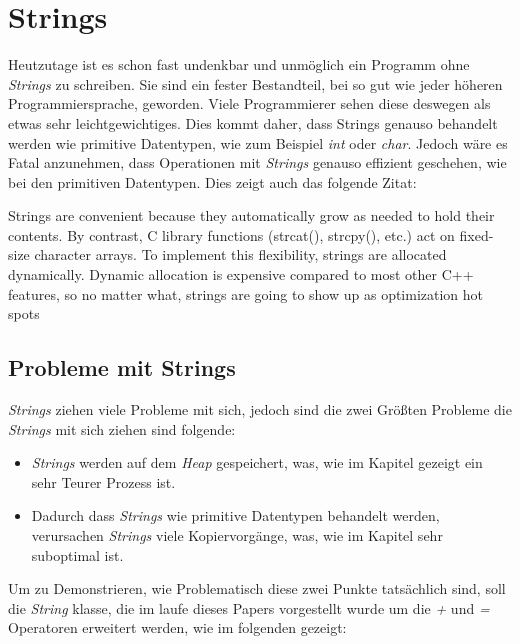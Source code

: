 \section{Strings}\label{sec:strings}
Heutzutage ist es schon fast undenkbar und unmöglich ein Programm ohne \emph{Strings} zu
schreiben. Sie sind ein fester Bestandteil, bei so gut wie jeder höheren Programmiersprache,
geworden. Viele Programmierer sehen diese deswegen als etwas sehr leichtgewichtiges. Dies kommt
daher, dass Strings genauso behandelt werden wie primitive Datentypen, wie zum Beispiel \emph{int}
oder \emph{char}. Jedoch wäre es Fatal anzunehmen, dass Operationen mit \emph{Strings} genauso
effizient
geschehen, wie bei den primitiven Datentypen. Dies zeigt auch das folgende Zitat:

\begin{zitat}
    Strings are convenient because they automatically grow as needed to hold their contents. By
    contrast, C library functions (strcat(), strcpy(), etc.) act on fixed-size character arrays.
    To implement this flexibility, strings are allocated dynamically. Dynamic allocation is
    expensive compared to most other C++ features, so no matter what, strings are going to show
    up as optimization hot spots \cite{OptimizedC++}
\end{zitat}

\subsection{Probleme mit Strings}\label{subsec:stringprobleme}
\emph{Strings} ziehen viele Probleme mit sich, jedoch sind die zwei Größten Probleme die
\emph{Strings} mit sich ziehen sind folgende:

\begin{itemize}
    \item \emph{Strings} werden auf dem \emph{Heap} gespeichert, was, wie im Kapitel
    \emph{} gezeigt ein sehr Teurer Prozess ist.
    \item Dadurch dass \emph{Strings} wie primitive Datentypen behandelt werden, verursachen
    \emph{Strings} viele Kopiervorgänge, was, wie im Kapitel \emph{} sehr
    suboptimal ist.
\end{itemize}

Um zu Demonstrieren, wie Problematisch diese zwei Punkte tatsächlich sind, soll die \emph{String}
klasse, die im laufe dieses Papers vorgestellt wurde um die \emph{+} und \emph{=} Operatoren
erweitert werden, wie im folgenden gezeigt:

